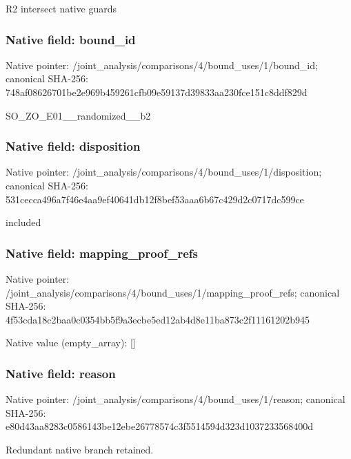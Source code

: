 \documentclass[10pt,a4paper]{article}
\begin{document}
\begingroup\raggedright\sloppy R2 intersect native guards\par\endgroup

\subsubsection{Native field: bound\_\allowbreak{}id}
Native pointer: /joint\_\allowbreak{}analysis/comparisons/4/bound\_\allowbreak{}uses/1/bound\_\allowbreak{}id; canonical SHA-256: 748af08626701be2e969b459261cfb09e59137d39833aa230fce151c8ddf829d

\begingroup\raggedright\sloppy SO\_\allowbreak{}ZO\_\allowbreak{}E01\_\allowbreak{}\_\allowbreak{}randomized\_\allowbreak{}\_\allowbreak{}b2\par\endgroup

\subsubsection{Native field: disposition}
Native pointer: /joint\_\allowbreak{}analysis/comparisons/4/bound\_\allowbreak{}uses/1/disposition; canonical SHA-256: 531cecca496a7f46e4aa9ef40641db12f8bef53aaa6b67c429d2c0717dc599ce

\begingroup\raggedright\sloppy included\par\endgroup

\subsubsection{Native field: mapping\_\allowbreak{}proof\_\allowbreak{}refs}
Native pointer: /joint\_\allowbreak{}analysis/comparisons/4/bound\_\allowbreak{}uses/1/mapping\_\allowbreak{}proof\_\allowbreak{}refs; canonical SHA-256: 4f53cda18c2baa0c0354bb5f9a3ecbe5ed12ab4d8e11ba873c2f11161202b945

Native value (empty\_\allowbreak{}array): []

\subsubsection{Native field: reason}
Native pointer: /joint\_\allowbreak{}analysis/comparisons/4/bound\_\allowbreak{}uses/1/reason; canonical SHA-256: e80d43aa8283c0586143be12ebe26778574c3f5514594d323d1037233568400d

\begingroup\raggedright\sloppy Redundant native branch retained.\par\endgroup
\end{document}
